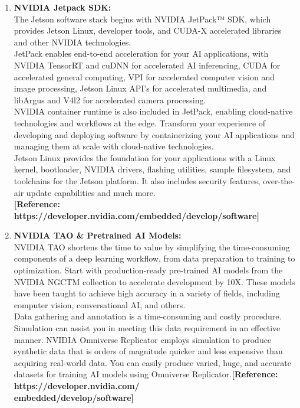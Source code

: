 \begin{enumerate}
	\item  \textbf{NVIDIA Jetpack SDK:}\\ 
	The Jetson software stack begins with NVIDIA JetPack™ SDK, which provides Jetson Linux, developer tools, and CUDA-X accelerated libraries and other NVIDIA technologies.\\
	
	JetPack enables end-to-end acceleration for your AI applications, with NVIDIA TensorRT and cuDNN for accelerated AI inferencing, CUDA for accelerated general computing, VPI for accelerated computer vision and image processing, Jetson Linux API’s for accelerated multimedia, and libArgus and V4l2 for accelerated camera processing.\\
	
	NVIDIA container runtime is also included in JetPack, enabling cloud-native technologies and workflows at the edge. Transform your experience of developing and deploying software by containerizing your AI applications and managing them at scale with cloud-native technologies.\\
	
	Jetson Linux provides the foundation for your applications with a Linux kernel, bootloader, NVIDIA drivers, flashing utilities, sample filesystem, and toolchains for the Jetson platform. It also includes security features, over-the-air update capabilities and much more.\\
	\textbf{[Reference: https://developer.nvidia.com/embedded/develop/software]}
	\item \textbf{NVIDIA TAO \& Pretrained AI Models:}\\
	NVIDIA TAO shortens the time to value by simplifying the time-consuming components of a deep learning workflow, from data preparation to training to optimization. Start with production-ready pre-trained AI models from the NVIDIA NGCTM collection to accelerate development by 10X. These models have been taught to achieve high accuracy in a variety of fields, including computer vision, conversational AI, and others.\\
	
	Data gathering and annotation is a time-consuming and costly procedure. Simulation can assist you in meeting this data requirement in an effective manner. NVIDIA Omniverse Replicator employs simulation to produce synthetic data that is orders of magnitude quicker and less expensive than acquiring real-world data. You can easily produce varied, huge, and accurate datasets for training AI models using Omniverse Replicator.\textbf{[Reference: https://developer.nvidia.com/\\embedded/develop/software]}
	

\end{enumerate}
